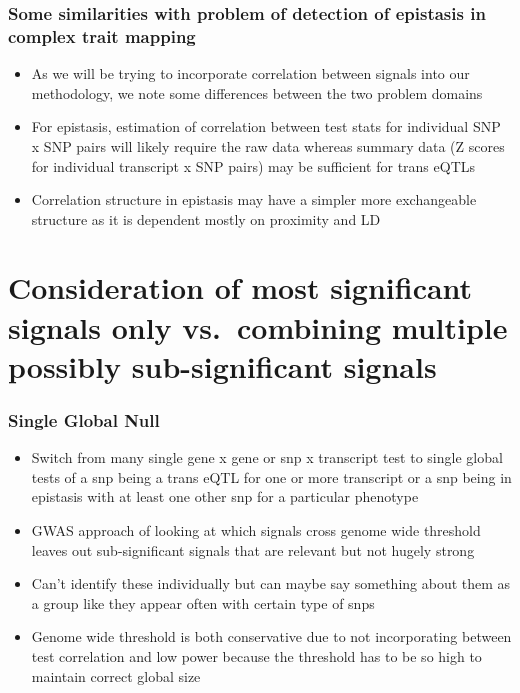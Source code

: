 \documentclass{beamer}
\begin{document}
\begin{frame}
\frametitle{Some similarities with problem of detection of epistasis in complex trait mapping}
\begin{itemize}
\item As we will be trying to incorporate correlation between signals into our methodology, we note some differences between the two problem domains
\item For epistasis, estimation of correlation between test stats for individual SNP x SNP pairs will likely require the raw data whereas summary data (Z scores for individual transcript x SNP pairs) may be sufficient for trans eQTLs
\item Correlation structure in epistasis may have a simpler more exchangeable structure as it is dependent mostly on proximity and LD
\end{itemize}
\end{frame}

\section{Consideration of most significant signals only vs.\ combining multiple possibly sub-significant signals}

\begin{frame}
\frametitle{Single Global Null}
\begin{itemize}
\item Switch from many single gene x gene or snp x transcript test to single global tests of a snp being a trans eQTL for one or more transcript or a snp being in epistasis with at least one other snp for a particular phenotype
\item GWAS approach of looking at which signals cross genome wide threshold leaves out sub-significant signals that are relevant but not hugely strong
\item Can’t identify these individually but can maybe say something about them as a group like they appear often with certain type of snps
\item Genome wide threshold is both conservative due to not incorporating between test correlation and low power because the threshold has to be so high to maintain correct global size
\end{itemize}
\end{frame}
\end{document}
